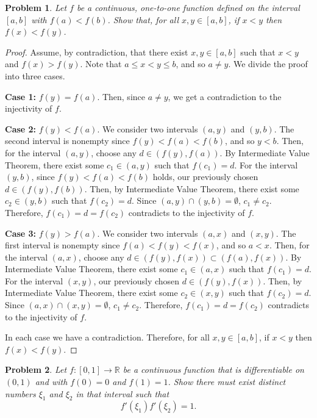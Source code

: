 \documentclass[11pt]{article}
\theoremstyle{plain}
\newtheorem{problem}{Problem}
\theoremstyle{remark}
\newcommand {\mbR} {\mathbb R}
\begin{document}
\begin{problem}
	Let $f$ be a continuous, one-to-one function defined on the interval $[a,b]$ with $f(a)<f(b)$. Show that, for all $x,y \in [a,b]$, if $x<y$ then $f(x)<f(y)$.
\end{problem}


\begin{proof}
	Assume, by contradiction, that there exist $x,y \in [a,b]$ such that $x<y$ and $f(x)>f(y)$. Note that $a \leq x <y \leq b$, and so $a\neq y$. 
	We divide the proof into three cases. 
	
	{\bf Case 1:} $f(y) = f(a)$. Then, since $a\neq y$, we get a contradiction to the injectivity of $f$.
	
	{\bf Case 2:} $f(y) < f(a)$. We consider two intervals $(a,y)$ and $(y,b)$. The second interval is nonempty since $f(y)<f(a)<f(b)$, and so $y < b$. Then, for the interval $(a,y)$, choose any $d \in (f(y), f(a))$. By Intermediate Value Theorem, there exist some $c_1 \in (a,y)$ such that $f(c_1) = d$. For the interval $(y,b)$, since $f(y)<f(a)<f(b)$ holds, 
	our previously chosen $d \in (f(y), f(b))$. Then, by Intermediate Value Theorem, there exist some $c_2 \in (y,b)$ such that $f(c_2) = d$. Since $(a,y) \cap (y,b) = \emptyset$, $c_1 \neq c_2$. Therefore, $f(c_1) = d = f(c_2)$ contradicts to the injectivity of $f$.
	
	{\bf Case 3:} $f(y) > f(a)$. We consider two intervals $(a,x)$ and $(x,y)$. The first interval is nonempty since $f(a)<f(y)<f(x)$, and so $a < x$. Then, for the interval $(a,x)$, choose any $d \in (f(y), f(x)) \subset (f(a), f(x))$. By Intermediate Value Theorem, there exist some $c_1 \in (a,x)$ such that $f(c_1) = d$. For the interval $(x,y)$, our previously chosen 
	$d \in (f(y), f(x))$. Then, by Intermediate Value Theorem, there exist some $c_2 \in (x,y)$ such that $f(c_2) = d$. Since $(a,x) \cap (x,y) = \emptyset$, $c_1 \neq c_2$. Therefore, $f(c_1) = d = f(c_2)$ contradicts to the injectivity of $f$.
	
	In each case we have a contradiction. Therefore, for all $x,y \in [a,b]$, if $x<y$ then $f(x)<f(y)$.

\end{proof}


\begin{problem}
	Let $f:[0,1] \to \mbR$ be a continuous function that is differentiable on 
	$(0,1)$ and with $f(0)=0$ and $f(1)=1$. Show there must exist distinct numbers $\xi_1$ and $\xi_2$ in that interval such that 
	$$
	f'(\xi_1)f'(\xi_2)=1.
	$$
\end{problem}
\end{document}
